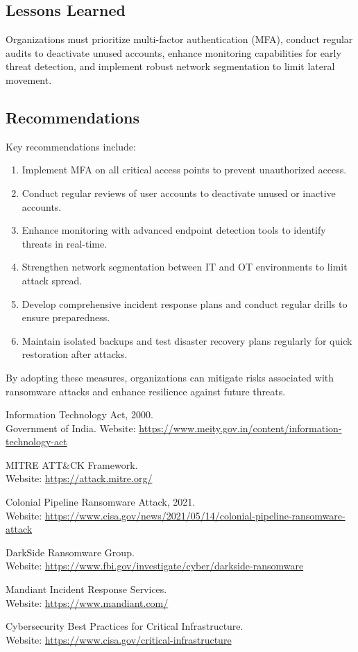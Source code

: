\documentclass[11pt]{article}
\begin{document}
\subsection*{Lessons Learned}
Organizations must prioritize multi-factor authentication (MFA), conduct regular audits to deactivate unused accounts, enhance monitoring capabilities for early threat detection, and implement robust network segmentation to limit lateral movement.

\subsection*{Recommendations}
Key recommendations include:
\begin{enumerate}
    \item Implement MFA on all critical access points to prevent unauthorized access.
    \item Conduct regular reviews of user accounts to deactivate unused or inactive accounts.
    \item Enhance monitoring with advanced endpoint detection tools to identify threats in real-time.
    \item Strengthen network segmentation between IT and OT environments to limit attack spread.
    \item Develop comprehensive incident response plans and conduct regular drills to ensure preparedness.
    \item Maintain isolated backups and test disaster recovery plans regularly for quick restoration after attacks.
\end{enumerate}

By adopting these measures, organizations can mitigate risks associated with ransomware attacks and enhance resilience against future threats.

\clearpage
\begin{thebibliography}{99}
	Information Technology Act, 2000. \\
	Government of India. Website: \url{https://www.meity.gov.in/content/information-technology-act}

	MITRE ATT\&CK Framework. \\
	Website: \url{https://attack.mitre.org/}

	Colonial Pipeline Ransomware Attack, 2021. \\
	Website: \url{https://www.cisa.gov/news/2021/05/14/colonial-pipeline-ransomware-attack}

	DarkSide Ransomware Group. \\
	Website: \url{https://www.fbi.gov/investigate/cyber/darkside-ransomware}

	Mandiant Incident Response Services. \\
	Website: \url{https://www.mandiant.com/}

	Cybersecurity Best Practices for Critical Infrastructure. \\
	Website: \url{https://www.cisa.gov/critical-infrastructure}

\end{thebibliography}
\end{document}
